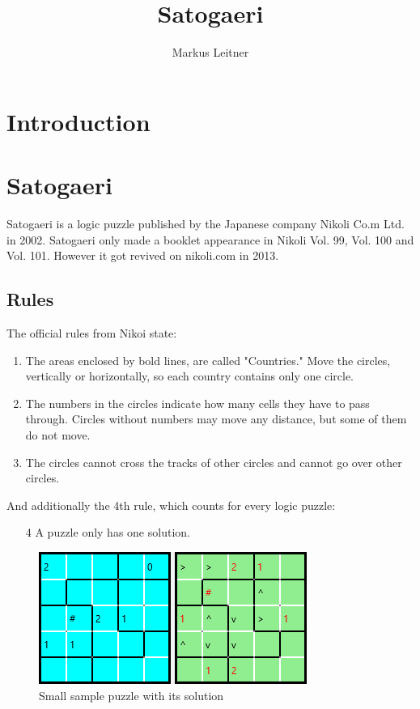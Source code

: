 \documentclass[a4paper,10pt]{paper}
\begin{document}
\title{Satogaeri}
\author{Markus Leitner}
\maketitle 
\tableofcontents

\section{Introduction}



\section{Satogaeri}
Satogaeri is a logic puzzle published by the Japanese company Nikoli Co.m Ltd. in 2002. Satogaeri only made a booklet appearance in Nikoli Vol. 99, Vol. 100 and Vol. 101. However it got revived on nikoli.com in 2013.

\subsection{Rules}
The official rules from Nikoi state:

\begin{enumerate}
  \item The areas enclosed by bold lines, are called "Countries." Move the circles, vertically or horizontally, so each country contains only one circle.
  \item The numbers in the circles indicate how many cells they have to pass through. Circles without numbers may move any distance, but some of them do not move.
  \item The circles cannot cross the tracks of other circles and cannot go over other circles. 
\end{enumerate}
And additionally the 4th rule, which counts for every logic puzzle:
\begin{enumerate}
  \item[4] A puzzle only has one solution.
\end{enumerate}

\begin{figure}
  \centering
  \includegraphics[scale=1]{Pictures/sample_small.png} 
  \caption{Small sample puzzle with its solution}
  \label{fig:sample_small}
\end{figure}
\end{document}
